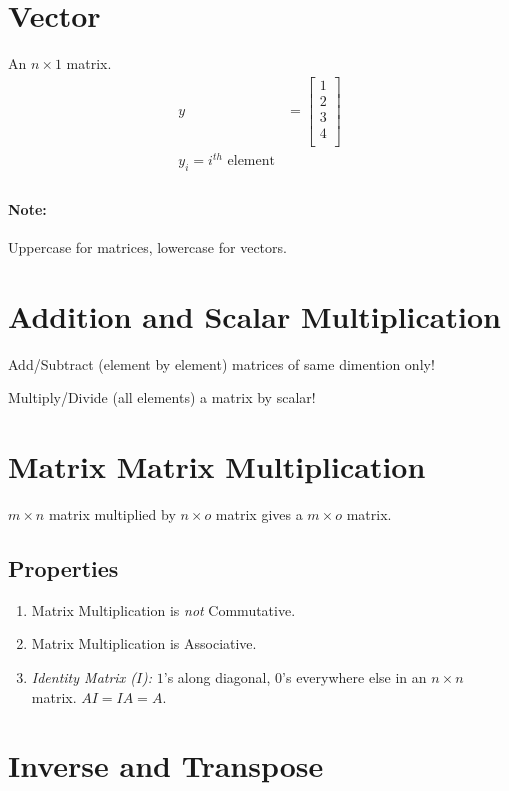\documentclass[a4paper, 12pt]{report}
\begin{document}
\section{Vector}
An $n \times 1$ matrix.
\begin{align*}
	y & =	\begin{bmatrix}
		1 \\
		2 \\
		3 \\
		4 \\
	\end{bmatrix} \\
	y_i = i^{th} \text{ element}    \\
\end{align*}

\paragraph*{Note:} Uppercase for matrices, lowercase for vectors.

\section{Addition and Scalar Multiplication}
Add/Subtract (element by element) matrices of same dimention only!

Multiply/Divide (all elements) a matrix by scalar!

\section{Matrix Matrix Multiplication}
$m \times n$ matrix multiplied by $n \times o$ matrix gives a $m \times o$ matrix.

\subsection*{Properties}
\begin{enumerate}
	\item Matrix Multiplication is \emph{not} Commutative.
	\item Matrix Multiplication is Associative.
	\item \emph{Identity Matrix ($I$):} $1$'s along diagonal, $0$'s everywhere else in an
	      $n \times n$ matrix. $AI = IA = A$.
\end{enumerate}

\section{Inverse and Transpose}
\end{document}
